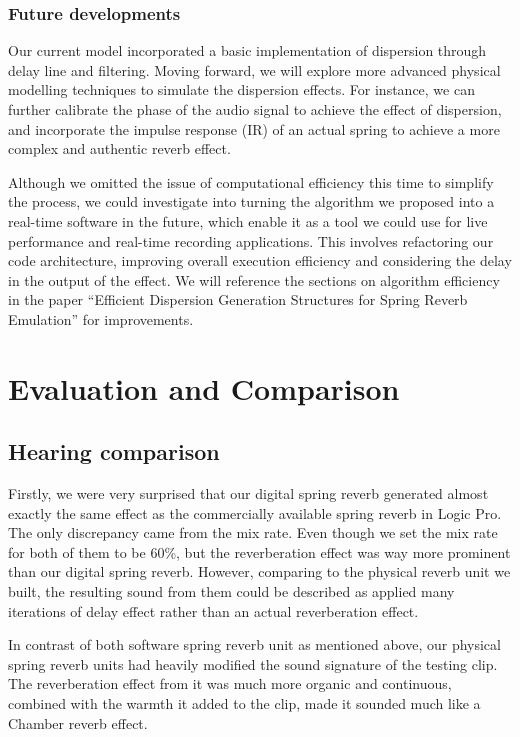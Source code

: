 \documentclass[12pt]{article}
\begin{document}
\newpage
\subsubsection{Future developments}

Our current model incorporated a basic implementation of dispersion through delay line and filtering. Moving forward, we will explore more advanced physical modelling techniques to simulate the dispersion effects. For instance, we can further calibrate the phase of the audio signal to achieve the effect of dispersion, and incorporate the impulse response (IR) of an actual spring to achieve a more complex and authentic reverb effect.

Although we omitted the issue of computational efficiency this time to simplify the process, we could investigate into turning the algorithm we proposed into a real-time software in the future, which enable it as a tool we could use for live performance and real-time recording applications. This involves refactoring our code architecture, improving overall execution efficiency and considering the delay in the output of the effect. We will reference the sections on algorithm efficiency in the paper ``Efficient Dispersion Generation Structures for Spring Reverb Emulation'' for improvements.


\newpage
\section{Evaluation and Comparison}

\subsection{Hearing comparison}

Firstly, we were very surprised that our digital spring reverb generated almost exactly the same effect as the commercially available spring reverb in Logic Pro. The only discrepancy came from the mix rate. Even though we set the mix rate for both of them to be 60\%, but the reverberation effect was way more prominent than our digital spring reverb. However, comparing to the physical reverb unit we built, the resulting sound from them could be described as applied many iterations of delay effect rather than an actual reverberation effect. 

In contrast of both software spring reverb unit as mentioned above, our physical spring reverb units had heavily modified the sound signature of the testing clip. The reverberation effect from it was much more organic and continuous, combined with the warmth it added to the clip, made it sounded much like a Chamber reverb effect.
 
\end{document}
